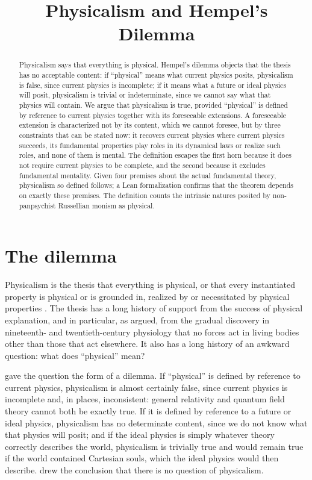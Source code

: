 \documentclass{situationist-preprint}
\title{Physicalism and Hempel's Dilemma}
\begin{document}
\maketitle

\begin{abstract}
Physicalism says that everything is physical. Hempel's dilemma objects that the thesis has no acceptable content: if \enquote{physical} means what current physics posits, physicalism is false, since current physics is incomplete; if it means what a future or ideal physics will posit, physicalism is trivial or indeterminate, since we cannot say what that physics will contain. We argue that physicalism is true, provided \enquote{physical} is defined by reference to current physics together with its foreseeable extensions. A foreseeable extension is characterized not by its content, which we cannot foresee, but by three constraints that can be stated now: it recovers current physics where current physics succeeds, its fundamental properties play roles in its dynamical laws or realize such roles, and none of them is mental. The definition escapes the first horn because it does not require current physics to be complete, and the second because it excludes fundamental mentality. Given four premises about the actual fundamental theory, physicalism so defined follows; a Lean formalization confirms that the theorem depends on exactly these premises. The definition counts the intrinsic natures posited by non-panpsychist Russellian monism as physical.
\end{abstract}

\section{The dilemma}

Physicalism is the thesis that everything is physical, or that every instantiated property is physical or is grounded in, realized by or necessitated by physical properties \citep{Stoljar2010}. The thesis has a long history of support from the success of physical explanation, and in particular, as \citet{Papineau2001} argued, from the gradual discovery in nineteenth- and twentieth-century physiology that no forces act in living bodies other than those that act elsewhere. It also has a long history of an awkward question: what does \enquote{physical} mean?

\citet{Hempel1969,Hempel1980} gave the question the form of a dilemma. If \enquote{physical} is defined by reference to current physics, physicalism is almost certainly false, since current physics is incomplete and, in places, inconsistent: general relativity and quantum field theory cannot both be exactly true. If it is defined by reference to a future or ideal physics, physicalism has no determinate content, since we do not know what that physics will posit; and if the ideal physics is simply whatever theory correctly describes the world, physicalism is trivially true and would remain true if the world contained Cartesian souls, which the ideal physics would then describe. \citet{CraneMellor1990} drew the conclusion that there is no question of physicalism.
\end{document}
